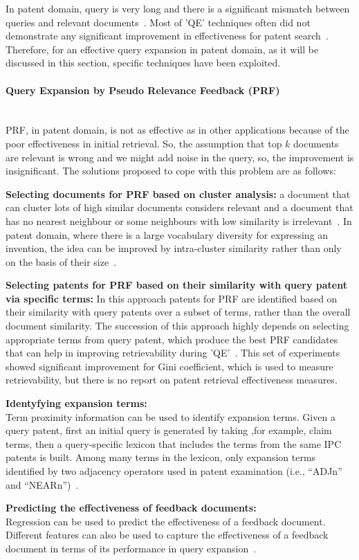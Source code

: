 In patent domain, query is very long and there is a significant mismatch between queries and relevant documents~\citep{roda2010clef, magdy2010exploring}. Most of 'QE' techniques often did not demonstrate any significant improvement in effectiveness for patent search~\citep{kishida2003experiment, konishi2005query}. Therefore, for an effective query expansion in patent domain, as it will be discussed in this section, specific techniques have been exploited.
\paragraph{Query Expansion by Pseudo Relevance Feedback (PRF)}
\ \\
PRF, in patent domain, is not as effective as in other applications because of the poor effectiveness in initial retrieval. So, the assumption that top $ k $ documents are relevant is wrong and we might add noise in the query, so, the improvement is insignificant. The solutions proposed to cope with this problem are as follows:
\begin{list}{-}{}
\item \textbf{Selecting documents for PRF based on cluster analysis:} a document that can cluster lots of high similar documents considers relevant and a document that has no nearest neighbour or some neighbours with low similarity is irrelevant~\citep{lee2008cluster}. In patent domain, where there is a large vocabulary diversity for expressing an invention, the idea can be improved by intra-cluster similarity rather than only on the basis of their size~\citep{bashir2009improving}. 
\item \textbf{Selecting patents for PRF based on their similarity with query patent via specific terms:} In this approach patents for PRF are identified based on their similarity with query patents over a subset of terms, rather than the overall document similarity. The succession of this approach highly depends on selecting appropriate terms from query patent, which produce the best PRF candidates that can help in improving retrievability during 'QE'~\citep{bashir2010improving}. This set of experiments showed significant improvement for Gini coefficient, which is used to measure retrievability, but there is no report on patent retrieval effectiveness measures.
\item \textbf{Identyfying expansion terms: } 
\ \\
Term proximity information can be used to identify expansion terms. Given a query patent, first an initial query is generated by taking ,for example, claim terms, then a query-specific lexicon that includes the terms from the same IPC patents is  built. Among many terms in the lexicon, only expansion terms identified by two adjacency operators used in patent examination (i.e., ``ADJn'' and ``NEARn'')~\citep{mahdabi2013leveraging}.
\item \textbf{Predicting the effectiveness of feedback documents: } 
\ \\
Regression can be used to predict the effectiveness of a feedback document. Different features can also be used to capture the effectiveness of a feedback document in terms of its performance in query expansion~\citep{mahdabi2012learning}.
\end{list}
